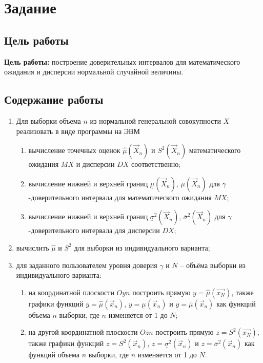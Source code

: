 \documentclass[12pt]{report}
\begin{document}


\chapter{Задание}

\section{Цель работы}

\textbf{Цель работы:} построение доверительных интервалов для математического ожидания и дисперсии нормальной случайной величины.

\section{Содержание работы}

\begin{enumerate}
    \item Для выборки объема $n$ из нормальной генеральной совокупности $X$ реализовать в виде программы на ЭВМ
        \begin{enumerate}
            \item вычисление точечных оценок $\hat\mu(\vec X_n)$ и $S^2(\vec X_n)$ математического ожидания $MX$ и дисперсии $DX$ соответственно;
            \item вычисление нижней и верхней границ $\underline\mu(\vec X_n)$, $\overline\mu(\vec X_n)$ для $\gamma$-доверительного интервала для математического ожидания $MX$;
            \item вычисление нижней и верхней границ $\underline\sigma^2(\vec X_n)$, $\overline\sigma^2(\vec X_n)$ для $\gamma$-доверительного интервала для дисперсии $DX$;
        \end{enumerate}
    \item вычислить $\hat\mu$ и $S^2$ для выборки из индивидуального варианта;
    \item для заданного пользователем уровня доверия $\gamma$ и $N$ – объёма выборки из индивидуального варианта:
        \begin{enumerate}
            \item на координатной плоскости $Oyn$ построить прямую $y = \hat\mu(\vec{x_N})$, также графики функций $y = \hat\mu(\vec x_n)$, $y = \underline\mu(\vec x_n)$ и $y = \overline\mu(\vec x_n)$ как функций объема $n$ выборки, где $n$ изменяется от 1 до $N$;
            \item на другой координатной плоскости $Ozn$ построить прямую $z = S^2(\vec{x_N})$, также графики функций $z = S^2(\vec x_n)$, $z = \underline\sigma^2(\vec x_n)$ и $z = \overline\sigma^2(\vec x_n)$ как функций объема $n$ выборки, где $n$ изменяется от 1 до $N$.
        \end{enumerate}
\end{enumerate}
\end{document}
